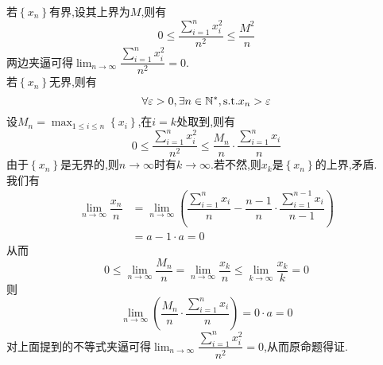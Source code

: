 \documentclass[a4paper]{ctexart}
\begin{document}
\begin{solution}[Proof.]
    若$\left\{x_n\right\}$有界,设其上界为$M$,则有
    $$0\leqslant \dfrac{\sum_{i=1}^{n}{x_i^2}}{n^2}\leqslant \dfrac{M^2}{n}$$
    两边夹逼可得$\displaystyle\lim_{n\to\infty}{\dfrac{\sum_{i=1}^{n}{x_i^2}}{n^2}}=0.$\\
    若$\left\{x_n\right\}$无界,则有
    $$\forall\varepsilon>0,\exists n\in\mathbb{N}^*,\text{s.t.} x_n>\varepsilon$$
    设$\displaystyle M_n=\max_{1\leqslant i\leqslant n}\left\{x_i\right\}$,在$i=k$处取到,则有
    $$0\leqslant\dfrac{\sum_{i=1}^{n}{x_i^2}}{n^2}\leqslant\dfrac{M_n}{n}\cdot\dfrac{\sum_{i=1}^{n}{x_i}}{n}$$
    由于$\left\{x_n\right\}$是无界的,则$n\to\infty$时有$k\to\infty$.若不然,则$x_k$是$\left\{x_n\right\}$的上界,矛盾.\\
    我们有
    \begin{align*}
        \lim_{n\to\infty}{\dfrac{x_n}{n}} 
        &= \lim_{n\to\infty}{\left(\dfrac{\sum_{i=1}^{n}{x_i}}{n}-\dfrac{n-1}{n}\cdot\dfrac{\sum_{i=1}^{n-1}{x_i}}{n-1}\right)} \\\
        &= a-1\cdot a= 0
    \end{align*}
    从而$$0\leqslant \lim_{n\to\infty}{\dfrac{M_n}{n}}=\lim_{n\to\infty}{\dfrac{x_k}{n}}\leqslant\lim_{k\to\infty}{\dfrac{x_k}{k}}=0$$
    则$$\lim_{n\to\infty}{\left(\dfrac{M_n}{n}\cdot\dfrac{\sum_{i=1}^{n}{x_i}}{n}\right)}=0\cdot a=0$$
    对上面提到的不等式夹逼可得$\displaystyle\lim_{n\to\infty}{\dfrac{\sum_{i=1}^{n}{x_i^2}}{n^2}}=0$,从而原命题得证.
\end{solution}
\end{document}
